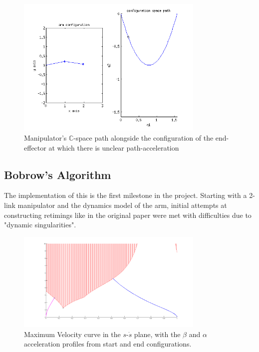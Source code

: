 \documentclass[letterpaper,10pt]{article} %
\begin{document}
\begin{figure}[h]
\centering
\includegraphics[width=0.8\textwidth]{pics/dynamic_singularity_pose}
\caption{Manipulator's $\mathbb{C}$-space path alongside the configuration of the end-effector at which there is unclear path-acceleration}
\label{fig:dynamic_singularity}
\end{figure}

\subsection{Bobrow's Algorithm}\label{sec:bobrow}

The implementation of this is the first milestone in the project. Starting with a 2-link manipulator and the dynamics model of the arm, initial attempts at constructing retimings like in the original paper were met with difficulties due to "dynamic singularities".

\begin{figure}[h]
\centering
\includegraphics[width=0.8\textwidth]{pics/box_constraint_mvc}
\caption{Maximum Velocity curve in the $s$-$\dot{s}$ plane, with the $\beta$ and $\alpha$ acceleration profiles from start and end configurations.}
\label{fig:box_mvc}
\end{figure}
\end{document}
